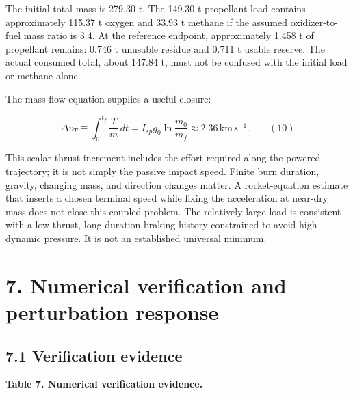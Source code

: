 \documentclass[
  11pt,
  a4paper,
]{article}
\begin{document}
The initial total mass is 279.30 t. The 149.30 t propellant load
contains approximately 115.37 t oxygen and 33.93 t methane if the
assumed oxidizer-to-fuel mass ratio is 3.4. At the reference endpoint,
approximately 1.458 t of propellant remains: 0.746 t unusable residue
and 0.711 t usable reserve. The actual consumed total, about 147.84 t,
must not be confused with the initial load or methane alone.

The mass-flow equation supplies a useful closure:

\[ \Delta v_T\equiv\int_0^{t_f}\frac{T}{m}\,dt=I_{sp}g_0\ln\frac{m_0}{m_f}\approx2.36\,\mathrm{km\,s^{-1}}. \qquad (10) \]

This scalar thrust increment includes the effort required along the
powered trajectory; it is not simply the passive impact speed. Finite
burn duration, gravity, changing mass, and direction changes matter. A
rocket-equation estimate that inserts a chosen terminal speed while
fixing the acceleration at near-dry mass does not close this coupled
problem. The relatively large load is consistent with a low-thrust,
long-duration braking history constrained to avoid high dynamic
pressure. It is not an established universal minimum.

\section{7. Numerical verification and perturbation
response}\label{numerical-verification-and-perturbation-response}

\subsection{7.1 Verification evidence}\label{verification-evidence}

\textbf{Table 7. Numerical verification evidence.}
\end{document}
